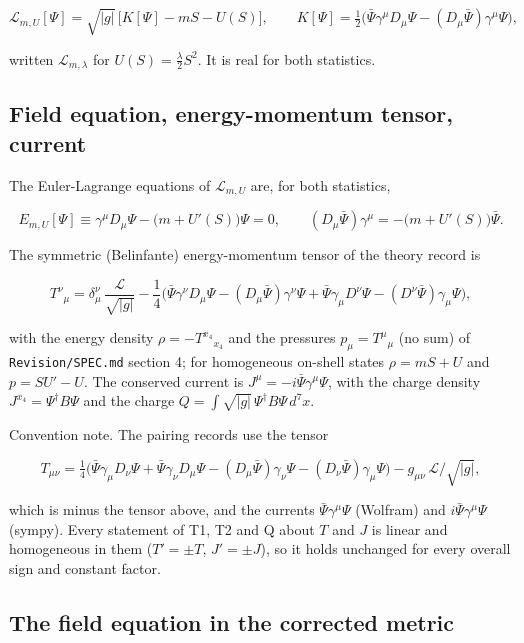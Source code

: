 \documentclass[11pt]{article}
\begin{document}
\[
\mathcal{L}_{m,U}[\Psi] = \sqrt{|g|}\,\big[K[\Psi] - mS - U(S)\big],\qquad
K[\Psi] = \tfrac12\big(\bar\Psi\gamma^\mu D_\mu\Psi - (D_\mu\bar\Psi)\gamma^\mu\Psi\big),
\]

written $\mathcal{L}_{m,\lambda}$ for $U(S) = \frac{\lambda}{2}S^2$. It is real for both statistics.

\subsection{Field equation, energy-momentum tensor, current}

The Euler-Lagrange equations of $\mathcal{L}_{m,U}$ are, for both statistics,

\[
E_{m,U}[\Psi] \equiv \gamma^\mu D_\mu\Psi - \big(m + U'(S)\big)\Psi = 0,\qquad
(D_\mu\bar\Psi)\gamma^\mu = -\big(m + U'(S)\big)\bar\Psi .
\]

The symmetric (Belinfante) energy-momentum tensor of the theory record is

\[
T^\nu{}_\mu = \delta^\nu_\mu\,\frac{\mathcal{L}}{\sqrt{|g|}} - \frac14\Big(\bar\Psi\gamma^\nu D_\mu\Psi - (D_\mu\bar\Psi)\gamma^\nu\Psi + \bar\Psi\gamma_\mu D^\nu\Psi - (D^\nu\bar\Psi)\gamma_\mu\Psi\Big),
\]

with the energy density $\rho = -T^{x_4}{}_{x_4}$ and the pressures $p_\mu = T^\mu{}_\mu$ (no sum) of \texttt{Revision\allowbreak{}/SPEC.md} section 4; for homogeneous on-shell states $\rho = mS + U$ and $p = SU' - U$. The conserved current is $J^\mu = -i\bar\Psi\gamma^\mu\Psi$, with the charge density $J^{x_4} = \Psi^\dagger B\Psi$ and the charge $Q = \int\sqrt{|g|}\,\Psi^\dagger B\Psi\,d^7x$.

Convention note. The pairing records use the tensor

\[
T_{\mu\nu} = \tfrac14\big(\bar\Psi\gamma_\mu D_\nu\Psi + \bar\Psi\gamma_\nu D_\mu\Psi - (D_\mu\bar\Psi)\gamma_\nu\Psi - (D_\nu\bar\Psi)\gamma_\mu\Psi\big) - g_{\mu\nu}\,\mathcal{L}/\sqrt{|g|},
\]

which is minus the tensor above, and the currents $\bar\Psi\gamma^\mu\Psi$ (Wolfram) and $i\bar\Psi\gamma^\mu\Psi$ (sympy). Every statement of T1, T2 and Q about $T$ and $J$ is linear and homogeneous in them ($T' = \pm T$, $J' = \pm J$), so it holds unchanged for every overall sign and constant factor.

\subsection{The field equation in the corrected metric}
\end{document}
